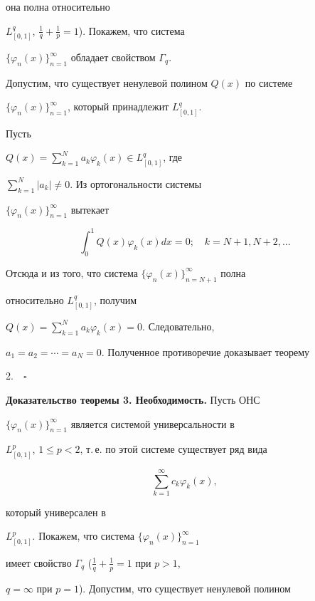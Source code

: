 она полна относительно 


$L^q_{[0,1]}$, $\frac{1}{q}+\frac{1}{p}=1$). Покажем, что система 


$\{\varphi_n(x)\}^\infty_{n=1}$ обладает свойством $\Gamma_q$. 


Допустим, что существует ненулевой полином $Q(x)$ по системе 


$\{\varphi_n(x)\}^\infty_{n=1}$, который принадлежит $L^q_{[0,1]}$. 


Пусть 


$Q(x)=\sum\limits^N_{k=1}a_k\varphi_k(x)\in L^q_{[0,1]}$, где 


$\sum\limits^N_{k=1}|a_k|\ne0$. Из ортогональности системы 


$\{\varphi_n(x)\}^\infty_{n=1}$ вытекает 


$$ 


\int^1_0 Q(x)\varphi_k(x)dx=0;\quad 


k=N+1,N+2,\dotsc 


$$ 


Отсюда и из того, что система $\{\varphi_n(x)\}^\infty_{n=N+1}$ полна 


относительно $L^q_{[0,1]}$, получим 


$Q(x)=\sum\limits^N_{k=1}a_k\varphi_k(x)=0$. Следовательно, 


$a_1=a_2=\dotsb=a_N=0$. Полученное противоречие доказывает теорему 


2.$\quad\square$ 


\medskip 


 


{\bf Доказательство теоремы 3. Необходимость.} Пусть ОНС 


$\{\varphi_n(x)\}^\infty_{n=1}$ является системой универсальности в 


$L^p_{[0,1]}$, $1\le p<2$, т.\,е. по этой системе существует ряд вида 


\begin{equation} 


\sum^\infty_{k=1}c_k\varphi_k(x), 


\end{equation} 


который универсален в 


$L^p_{[0,1]}$. Покажем, что система $\{\varphi_n(x)\}^\infty_{n=1}$ 


имеет свойство $\Gamma_q$ ($\frac{1}{q}+\frac{1}p{=1}$ при $p>1$, 


$q=\infty$ при $p=1$). Допустим, что существует ненулевой полином 


